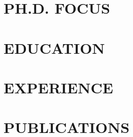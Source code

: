 \documentclass[margin]{res}
\begin{document}

\address{ 306 J St \#53 \\ Davis, CA, 95616 \\ +1 (775) 846-5712 \\ cpunerd@gmail.com }


\begin{resume}

\section{PH.D. FOCUS}   
\section{EDUCATION}     
\section{EXPERIENCE}    
\section{PUBLICATIONS}  

\end{resume}
\end{document}
